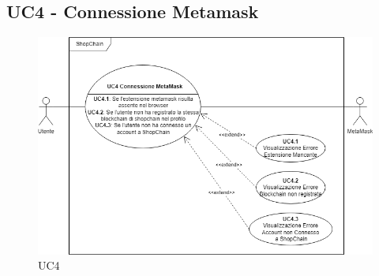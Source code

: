 \subsection{UC4 - Connessione Metamask}

\begin{figure}[H]
    \centering
    \includegraphics[scale=0.7]{immagini/UC4.png}
    \caption{UC4}
\end{figure}

